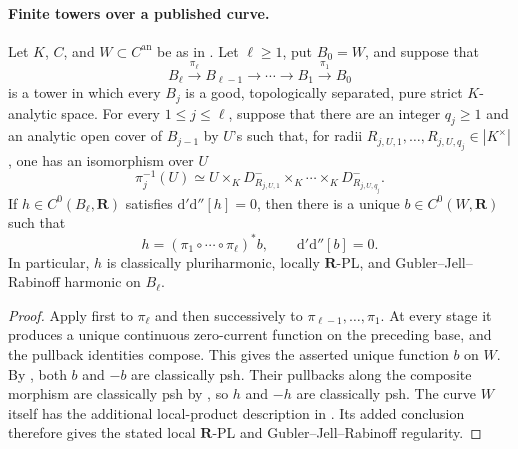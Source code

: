\paragraph{Finite towers over a published curve.}
\begin{corollary}
\label{cor:p062-iterated-open-polydisc-bundles-over-curves}
Let \(K\), \(C\), and \(W\subset C^{\mathrm{an}}\) be as in
.  Let \(\ell\geq1\), put \(B_0=W\),
and suppose that
\[
 B_\ell\xrightarrow{\pi_\ell}B_{\ell-1}
 \longrightarrow\cdots\longrightarrow B_1
 \xrightarrow{\pi_1}B_0
\]
is a tower in which every \(B_j\) is a good, topologically separated, pure
strict \(K\)-analytic space.  For every \(1\leq j\leq\ell\), suppose that
there are an integer \(q_j\geq1\) and an analytic open cover of
\(B_{j-1}\) by \(U\)'s such that, for radii
\(R_{j,U,1},\ldots,R_{j,U,q_j}\in|K^\times|\), one has an isomorphism
over \(U\)
\[
 \pi_j^{-1}(U)\simeq
 U\times_KD_{R_{j,U,1}}^-\times_K\cdots\times_KD_{R_{j,U,q_j}}^-.
\]
If \(h\in C^0(B_\ell,\mathbf R)\) satisfies
\(\mathrm d'\mathrm d''[h]=0\), then there is a unique
\(b\in C^0(W,\mathbf R)\) such that
\[
 h=(\pi_1\circ\cdots\circ\pi_\ell)^*b,
 \qquad
 \mathrm d'\mathrm d''[b]=0.
\]
In particular, \(h\) is classically pluriharmonic, locally
\(\mathbf R\)-PL, and Gubler--Jell--Rabinoff harmonic on \(B_\ell\).
\end{corollary}

\begin{proof}
Apply  first to \(\pi_\ell\)
and then successively to \(\pi_{\ell-1},\ldots,\pi_1\).  At every stage
it produces a unique continuous zero-current function on the preceding
base, and the pullback identities compose.  This gives the asserted unique
function \(b\) on \(W\).  By
, both \(b\) and \(-b\)
are classically psh.  Their pullbacks along the composite morphism are
classically psh by \cite[Proposition~4.2(6)]{GR25Classical}, so \(h\) and
\(-h\) are classically psh.
The curve \(W\) itself has the additional local-product description in
.  Its added
conclusion therefore gives the stated local \(\mathbf R\)-PL and
Gubler--Jell--Rabinoff regularity.
\end{proof}

